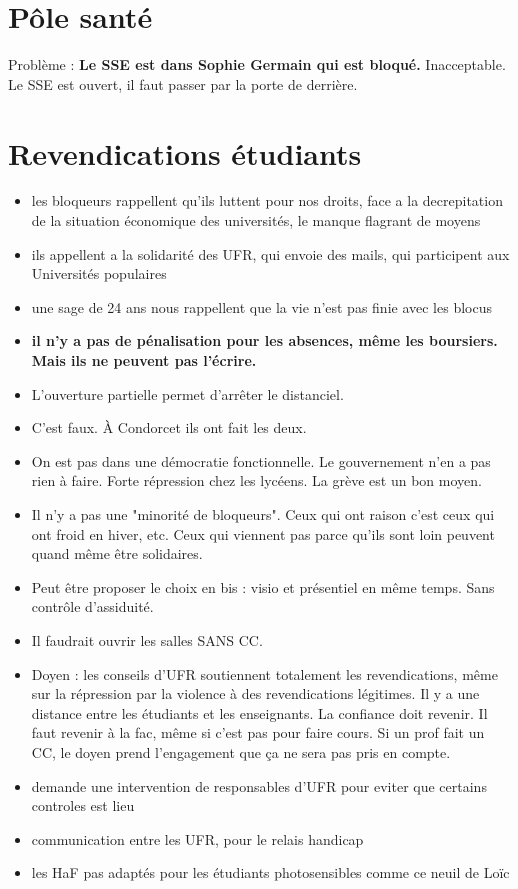 \documentclass{article}
\begin{document}
\section{Pôle santé}

Problème : \textbf{Le SSE est dans Sophie Germain qui est bloqué.}
Inacceptable. Le SSE est ouvert, il faut passer par la porte de derrière.

\section{Revendications étudiants}
\begin{itemize}
    \item les bloqueurs rappellent qu'ils luttent pour nos droits, face a la decrepitation de la situation économique des universités, le manque flagrant de moyens
    \item ils appellent a la solidarité des UFR, qui envoie des mails, qui participent aux Universités populaires
    \item une sage de 24 ans nous rappellent que la vie n'est pas finie avec les blocus
    \item \textbf{il n'y a pas de pénalisation pour les absences, même les boursiers. Mais ils ne peuvent pas l'écrire.}
    \item L'ouverture partielle permet d'arrêter le distanciel.
    \item C'est faux. À Condorcet ils ont fait les deux.
    \item On est pas dans une démocratie fonctionnelle. Le gouvernement n'en a pas rien à faire. Forte répression chez les lycéens. La grève est un bon moyen.
    \item Il n'y a pas une "minorité de bloqueurs". Ceux qui ont raison c'est ceux qui ont froid en hiver, etc. Ceux qui viennent pas parce qu'ils sont loin peuvent quand même être solidaires.
    \item Peut être proposer le choix en bis : visio et présentiel en même temps. Sans contrôle d'assiduité.
    \item Il faudrait ouvrir les salles SANS CC.
    \item Doyen : les conseils d'UFR soutiennent totalement les revendications, même sur la répression par la violence à des revendications légitimes. Il y a une distance entre les étudiants et les enseignants. La confiance doit revenir. Il faut revenir à la fac, même si c'est pas pour faire cours. Si un prof fait un CC, le doyen prend l'engagement que ça ne sera pas pris en compte.
    \item demande une intervention de responsables d'UFR pour eviter que certains controles est lieu
    \item communication entre les UFR, pour le relais handicap
    \item les HaF pas adaptés pour les étudiants photosensibles comme ce neuil de Loïc 
\end{itemize}
\end{document}
